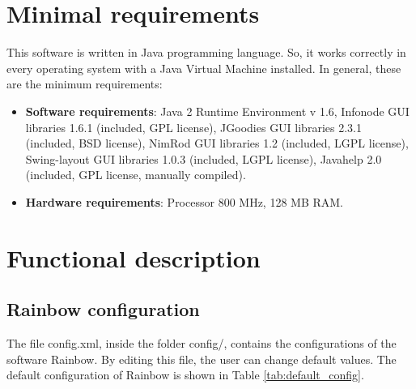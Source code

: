 \documentclass[10pt,a4paper,twoside,titlepage]{article}
\begin{document}
\section{Minimal requirements}
\label{sec:minimal_requirements}
This software is written in Java programming language. So, it works correctly in every operating system with a Java Virtual Machine installed. In general, these are the minimum requirements:
\begin{itemize}
 \item \textbf{Software requirements}: Java 	2 Runtime Environment v 1.6, Infonode GUI libraries 1.6.1 (included, GPL license),  JGoodies GUI libraries 2.3.1 (included, BSD license), NimRod GUI libraries 1.2 (included, LGPL license), Swing-layout GUI libraries 1.0.3 (included, LGPL license), Javahelp 2.0 (included, GPL license, manually compiled).
 \item \textbf{Hardware requirements}: Processor 800 MHz, 128 MB RAM. 
\end{itemize}



\section{Functional description}
\label{sec:functional_description}

\subsection{Rainbow configuration}
\label{subsec:rainbow_configuration}
The file config.xml, inside the folder config/, contains the configurations of the software Rainbow. By editing this file, the user can change default values. 
The default configuration of Rainbow is shown in Table \ref{tab:default_config}.
\end{document}
